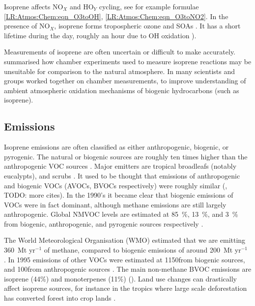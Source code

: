     Isoprene affects NO$_X$ and HO$_Y$ cycling, see for example formulae \ref{LR:Atmos:Chem:eqn_O3toOH}, \ref{LR:Atmos:Chem:eqn_O3toNO2}.
    In the presence of NO$_X$, isoprene forms tropospheric ozone and SOAs \citep{Wagner2002, Millet2006}.
    It has a short lifetime during the day, roughly an hour due to OH oxidation \citep{AtkinsonArey2003}).
    
    
    Measurements of isoprene are often uncertain or difficult to make accurately.
    \cite{Kanakidou2005} summarised how chamber experiments used to measure isoprene reactions may be unsuitable for comparison to the natural atmosphere.
    In \cite{Nguyen2014} many scientists and groups worked together on chamber measurements, to improve understanding of ambient atmospheric oxidation mechanisms of biogenic hydrocarbons (such as isoprene).
    
    
    
    
  \subsection{Emissions}
  \label{LR:VOCs:Emissions}
    
    
    Isoprene emissions are often classified as either anthropogenic, biogenic, or pyrogenic.
    The natural or biogenic sources are roughly ten times higher than the anthropogenic VOC sources \citep{Guenther2006, Kanakidou2005}.
    Major emitters are tropical broadleafs (notably eucalypts), and scrubs \citep{Guenther2006, Arneth2008, Niinemets2010, Monks2015}.
    It used to be thought that emissions of anthropogenic and biogenic VOCs (AVOCs, BVOCs respectively) were roughly similar (\cite{Muller1992}, TODO: more cites).
    In the 1990's it became clear that biogenic emissions of VOCs were in fact dominant, although methane emissions are still largely anthropogenic. 
    Global NMVOC levels are estimated at 85~\%, 13~\%, and 3~\% from biogenic, anthropogenic, and pyrogenic sources respectively \citep{Kanakidou2005, Kefauver2014}.
    
    The World Meteorological Organisation (WMO) estimated that we are emitting 360~Mt yr$^{-1}$ of methane, compared to biogenic emissions of around 200~Mt yr$^{-1}$ \citep{Atkinson2000}.
    In 1995 emissions of other VOCs were estimated at 1150\tgcpyr from biogenic sources, and 100\tgcpyr from anthropogenic sources \citep{Guenther1995, Atkinson2000}.
    The main non-methane BVOC emissions are isoprene (44\%) and monoterpenes (11\%) (\cite{Guenther2000, Kefauver2014}). 
    Land use changes can drastically affect isoprene sources, for instance in the tropics where large scale deforestation has converted forest into crop lands \citep{Kanakidou2005}.

